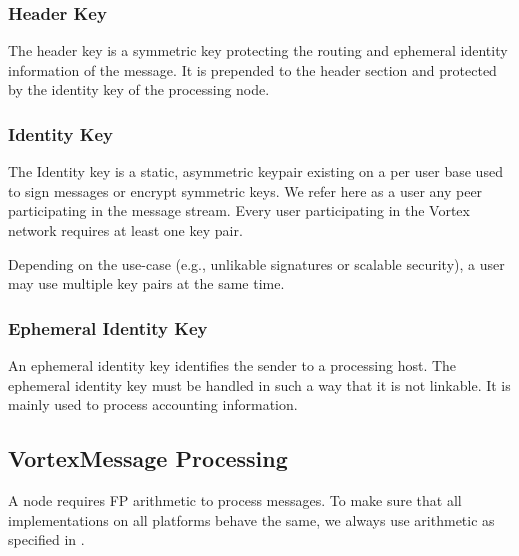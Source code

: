 \subsubsection{Header Key}
The header key is a symmetric key protecting the routing and ephemeral identity information of the message. It is prepended to the header section and protected by the identity key of the processing node.

\subsubsection{Identity Key}
The Identity key is a static, asymmetric keypair existing on a per user base used to sign messages or encrypt symmetric keys. We refer here as a user any peer participating in the message stream. Every user participating in the Vortex network requires at least one key pair. 

Depending on the use-case (e.g., unlikable signatures or scalable security), a user may use multiple key pairs at the same time.

\subsubsection{Ephemeral Identity Key}
An ephemeral identity key identifies the sender to a processing host. The ephemeral identity key must be handled in such a way that it is not linkable. It is mainly used to process accounting information.

\subsection{VortexMessage Processing}
A node requires FP arithmetic to process messages. To make sure that all implementations on all platforms behave the same, we always use arithmetic as specified in \cite{IEEE754}.

